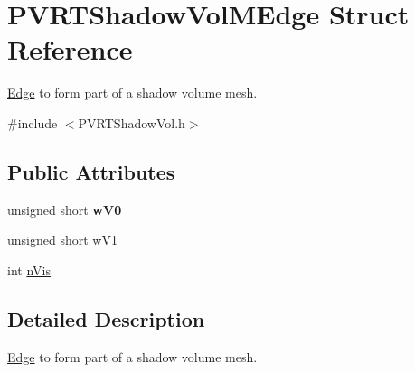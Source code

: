 \hypertarget{struct_p_v_r_t_shadow_vol_m_edge}{\section{P\+V\+R\+T\+Shadow\+Vol\+M\+Edge Struct Reference}
\label{struct_p_v_r_t_shadow_vol_m_edge}
}


\hyperlink{struct_edge}{Edge} to form part of a shadow volume mesh.  




{\ttfamily \#include $<$P\+V\+R\+T\+Shadow\+Vol.\+h$>$}

\subsection*{Public Attributes}
\begin{DoxyCompactItemize}
\item 
\hypertarget{struct_p_v_r_t_shadow_vol_m_edge_ad88736a6506b9e2229380b92bdc6f309}{unsigned short {\bfseries w\+V0}}\label{struct_p_v_r_t_shadow_vol_m_edge_ad88736a6506b9e2229380b92bdc6f309}

\item 
unsigned short \hyperlink{struct_p_v_r_t_shadow_vol_m_edge_a8dc997a06be70b865f762bff1229b18a}{w\+V1}
\item 
int \hyperlink{struct_p_v_r_t_shadow_vol_m_edge_ad23fb467a77250672d033523cac402e9}{n\+Vis}
\end{DoxyCompactItemize}


\subsection{Detailed Description}
\hyperlink{struct_edge}{Edge} to form part of a shadow volume mesh. 



 


